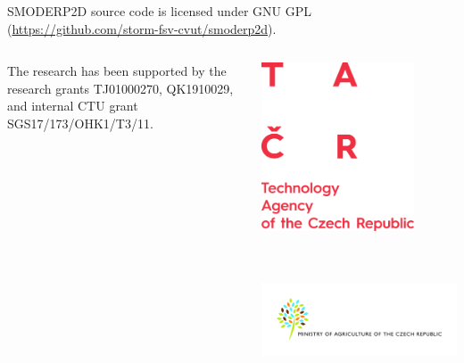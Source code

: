 \justifying
{\rmfamily
\vspace{0.4cm}
SMODERP2D source code is licensed under GNU
GPL (\url{https://github.com/storm-fsv-cvut/smoderp2d}).
}

\begin{columns}
    \begin{column}{0.4\textwidth}
        \justifying
        {\rmfamily
        The research has been supported by the research grants
        TJ01000270,
        QK1910029,
        and internal CTU grant SGS17/173/OHK1/T3/11.
        }
    \end{column}
    \begin{column}{0.6\textwidth}
        \centering
        \includegraphics[height = 5cm]{obr/logo_TACR_dopln_AJ.png}
        \includegraphics[height = 5cm]{obr/LogoMZeAJ.jpg}
    \end{column}
\end{columns}




